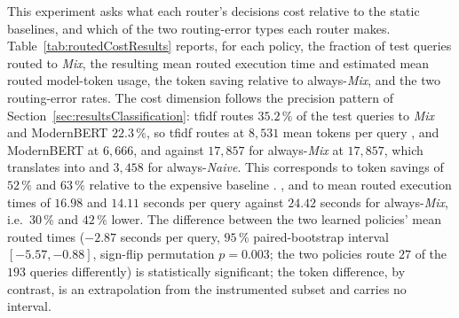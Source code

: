 \documentclass[english, bibtex]{kththesis}               %
\numberwithin{listing}{chapter}
\providecommand{\DIFaddtex}[1]{{\protect\color{blue} \sf #1}} %
\providecommand{\DIFdeltex}[1]{{\protect\color{red} \scriptsize #1}} %
\providecommand{\DIFaddbegin}{} %
\providecommand{\DIFaddend}{} %
\providecommand{\DIFdelbegin}{} %
\providecommand{\DIFdelend}{} %
\providecommand{\DIFadd}[1]{\texorpdfstring{\DIFaddtex{#1}}{#1}} %
\providecommand{\DIFdel}[1]{\texorpdfstring{\DIFdeltex{#1}}{}} %
\begin{document}
\DIFadd{This experiment asks what each router's decisions cost relative to the static baselines, and which of the two routing-error types each router makes. Table~\ref{tab:routedCostResults} reports, for each policy, the fraction of test queries routed to \emph{Mix}, the resulting mean routed execution time and estimated mean routed model-token usage, the token saving relative to always-\emph{Mix}, and the two routing-error rates. }\DIFaddend The cost dimension follows the precision pattern \DIFaddbegin \DIFadd{of Section~\ref{sec:resultsClassification}}\DIFaddend : \gls{tfidf} routes \DIFaddbegin \DIFadd{$35.2\,\%$ of the test queries to \emph{Mix} and ModernBERT $22.3\,\%$, so \gls{tfidf} routes }\DIFaddend at $8{,}531$ mean tokens per query \DIFdelbegin \DIFdel{, }\DIFdelend \DIFaddbegin \DIFadd{and }\DIFaddend ModernBERT at $6{,}666$, \DIFdelbegin \DIFdel{and }\DIFdelend \DIFaddbegin \DIFadd{against $17{,}857$ for }\DIFaddend always-\emph{Mix} \DIFdelbegin \DIFdel{at $17{,}857$, which translates into }\DIFdelend \DIFaddbegin \DIFadd{and $3{,}458$ for always-\emph{Naive}. This corresponds to }\DIFaddend token savings of $52\,\%$ and $63\,\%$ relative to the expensive baseline\DIFdelbegin \DIFdel{.
}\DIFdelend \DIFaddbegin \DIFadd{, and to mean routed execution times of $16.98$ and $14.11$ seconds per query against $24.42$ seconds for always-\emph{Mix}, i.e.\ $30\,\%$ and $42\,\%$ lower. The difference between the two learned policies' mean routed times ($-2.87$ seconds per query, $95\,\%$ paired-bootstrap interval $[-5.57, -0.88]$, sign-flip permutation $p = 0.003$; the two policies route $27$ of the $193$ queries differently) is statistically significant; the token difference, by contrast, is an extrapolation from the instrumented subset and carries no interval.
}\DIFaddend 
\end{document}
